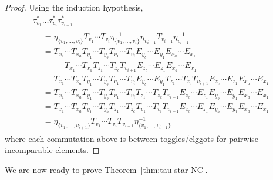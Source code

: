 \documentclass[10pt]{amsart}
\theoremstyle{definition}
\newcommand\mydots{\cdots}
\begin{document}
\begin{proof}
Using the induction hypothesis,
\begin{multline*}
 \tau_{v_1}^*\dots \tau_{v_i}^* \tau_{v_{i+1}}^* \\
\begin{aligned}
&=
\eta_{\{v_1,\dots,v_i\}} T_{v_1}\mydots T_{v_i} \eta_{\{v_1,\dots,v_i\}}^{-1}\eta_{v_{i+1}} T_{v_{i+1}} \eta_{v_{i+1}}^{-1}\\
&=
T_{x_1}\mydots T_{x_a} T_{y_1} \mydots T_{y_b} T_{v_1} \mydots T_{v_i} E_{y_b} \mydots E_{y_1} E_{x_a}\mydots E_{x_1}\\&\phantom{==} T_{x_1}\mydots T_{x_a} T_{z_1} \mydots T_{z_c} T_{v_{i+1}} E_{z_c} \mydots E_{z_1} E_{x_a}\mydots E_{x_1}\\
&=
T_{x_1}\mydots T_{x_a} T_{y_1} \mydots T_{y_b} T_{v_1} \mydots T_{v_i} E_{y_b} \mydots E_{y_1} T_{z_1} \mydots T_{z_c} T_{v_{i+1}} E_{z_c} \mydots E_{z_1} E_{x_a}\mydots E_{x_1}\\
&=
T_{x_1}\mydots T_{x_a} T_{y_1} \mydots T_{y_b} T_{v_1} \mydots T_{v_i} T_{z_1} \mydots T_{z_c} T_{v_{i+1}} E_{z_c} \mydots E_{z_1} E_{y_b} \mydots E_{y_1} E_{x_a}\mydots E_{x_1}\\
&=
T_{x_1}\mydots T_{x_a} T_{y_1} \mydots T_{y_b} T_{z_1} \mydots T_{z_c} T_{v_1} \mydots T_{v_i} T_{v_{i+1}} E_{z_c} \mydots E_{z_1} E_{y_b} \mydots E_{y_1} E_{x_a}\mydots E_{x_1}\\
&=
\eta_{\{v_1,\dots,v_{i+1}\}} T_{v_1}\mydots T_{v_i}
T_{v_{i+1}}\eta_{\{v_1,\dots,v_{i+1}\}}^{-1}
\end{aligned}
\end{multline*}
where each commutation above is between toggles/elggots for pairwise incomparable elements.
\end{proof}

We are now ready to prove Theorem~\ref{thm:tau-star-NC}.
\end{document}

